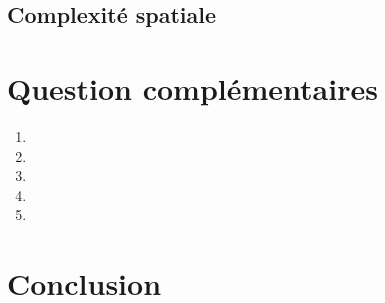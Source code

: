 \documentclass[a4paper, titlepage]{article}
\begin{document}
	\subsection{Complexité spatiale}

\section{Question complémentaires}
\begin{enumerate}
\item
\item
\item
\item
\item
\end{enumerate}

\section{Conclusion}
\end{document}
